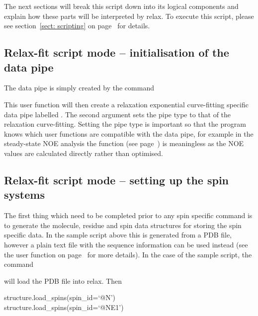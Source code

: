 The next sections will break this script down into its logical components and explain how these parts will be interpreted by relax.  To execute this script, please see section~\ref{sect: scripting} on page~\pageref{sect: scripting} for details.



\subsection{Relax-fit script mode -- initialisation of the data pipe} \label{Rx initialisation}

The data pipe is simply created by the command


This user function will then create a relaxation exponential curve-fitting specific data pipe labelled .  The second argument sets the pipe type to that of the relaxation curve-fitting.  Setting the pipe type is important so that the program knows which user functions are compatible with the data pipe, for example in the steady-state NOE analysis the function  (see page~\pageref{uf: minimise}) is meaningless as the NOE values are calculated directly rather than optimised.



\subsection{Relax-fit script mode -- setting up the spin systems}

The first thing which need to be completed prior to any spin specific command is to generate the molecule, residue and spin data structures for storing the spin specific data.  In the sample script above this is generated from a PDB file, however a plain text file with the sequence information can be used instead (see the  user function on page~\pageref{uf: sequence.read} for more details).  In the case of the sample script, the command


will load the PDB file  into relax.  Then 

\begin{exampleenv}
structure.load\_spins(spin\_id=`@N') \\
structure.load\_spins(spin\_id=`@NE1')
\end{exampleenv}

